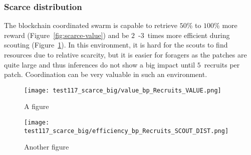 \documentclass[runningheads]{llncs}
\begin{document}
\subsubsection{Scarce distribution}

The blockchain coordinated swarm is capable to retrieve $50$\% to $100$\% more reward (Figure~\ref{fig:scarce-value}) and be $2$~-$3$~times more efficient during scouting (Figure~\ref{fig:scarce-eff-scout}). In this environment, it is hard for the scouts to find resources due to relative scarcity, but it is easier for foragers as the patches are quite large and thus inferences do not show a big impact until $5$~recruits per patch. Coordination can be very valuable in such an environment.

\begin{figure}
\centering
\begin{minipage}{.495\textwidth}
  \centering
  \texttt{[image: test117\_scarce\_big/value\_bp\_Recruits\_VALUE.png]}
  \caption{A figure}
  \label{fig:scarce-value}
\end{minipage}
\begin{minipage}{.495\textwidth}
  \centering
  \texttt{[image: test117\_scarce\_big/efficiency\_bp\_Recruits\_SCOUT\_DIST.png]}
  \caption{Another figure}
  \label{fig:scarce-eff-scout}
\end{minipage}
\end{figure}

\end{document}
